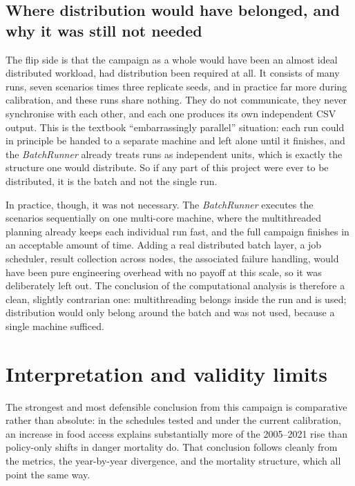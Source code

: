 \subsection{Where distribution would have belonged, and why it was still not needed}

The flip side is that the campaign as a whole would have been an almost ideal distributed workload, had distribution been required at all. It consists of many runs, seven scenarios times three replicate seeds, and in practice far more during calibration, and these runs share nothing. They do not communicate, they never synchronise with each other, and each one produces its own independent CSV output. This is the textbook ``embarrassingly parallel'' situation: each run could in principle be handed to a separate machine and left alone until it finishes, and the \emph{BatchRunner} already treats runs as independent units, which is exactly the structure one would distribute. So if any part of this project were ever to be distributed, it is the batch and not the single run.

In practice, though, it was not necessary. The \emph{BatchRunner} executes the scenarios sequentially on one multi-core machine, where the multithreaded planning already keeps each individual run fast, and the full campaign finishes in an acceptable amount of time. Adding a real distributed batch layer, a job scheduler, result collection across nodes, the associated failure handling, would have been pure engineering overhead with no payoff at this scale, so it was deliberately left out. The conclusion of the computational analysis is therefore a clean, slightly contrarian one: multithreading belongs inside the run and is used; distribution would only belong around the batch and was not used, because a single machine sufficed.

\section{Interpretation and validity limits}

The strongest and most defensible conclusion from this campaign is comparative rather than absolute: in the schedules tested and under the current calibration, an increase in food access explains substantially more of the 2005--2021 rise than policy-only shifts in danger mortality do. That conclusion follows cleanly from the metrics, the year-by-year divergence, and the mortality structure, which all point the same way.

